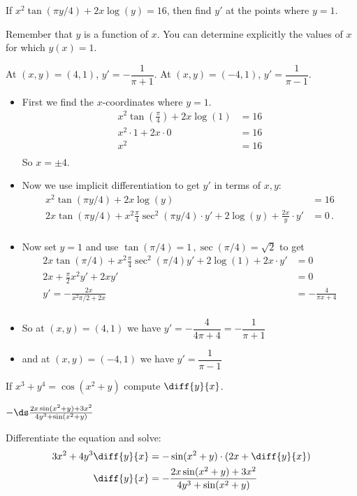\begin{Mquestion}[2015Q]
If $x^2\tan(\pi y/4)+2x\log(y) = 16$, then find $y'$ at the points where $y=1$.
\end{Mquestion}
\begin{hint}
Remember that $y$ is a function of $x$. You can determine
        explicitly the values of $x$ for which $y(x)=1$.
\end{hint}
\begin{answer}
At $(x,y)=(4,1)$, $y' =
-\dfrac{1}{\pi + 1}$.
At $(x,y)=(-4,1)$,  $y' = \dfrac{1}{\pi-1}$.
\end{answer}
\begin{solution}
\begin{itemize}
 \item First we find the $x$-coordinates where $y=1$.
\begin{align*}
  x^2\tan\left(\frac{\pi}{4}\right)+2x\log(1) &= 16 \\
  x^2\cdot 1 +2x\cdot 0 &=16\\
  x^2 &= 16\\
\end{align*}
So $x=\pm 4$.
\item Now we use implicit differentiation to get $y'$ in terms of $x,y$:
\begin{align*}
  x^2\tan(\pi y/4)+2x\log(y) &= 16\\
  2x\tan(\pi y/4) + x^2 \frac{\pi}{4}\sec^2(\pi y/4)\cdot y' + 2\log(y) + \frac{2x}{y} \cdot y' &= 0\,.\\
\end{align*}
\item Now set $y=1$ and use $\tan(\pi/4)=1\,, \sec(\pi/4)=\sqrt{2}$ to get
\begin{align*}
  2x\tan(\pi/4) + x^2 \frac{\pi}{4} \sec^2(\pi/4)y' + 2\log(1) + 2x\cdot y' &= 0\\
  2x + \frac{\pi}{2} x^2 y' +2x y' &= 0 \\
  y' = -\frac{2x}{x^2 \pi/2 + 2x} &= -\frac{4}{\pi x + 4}  \\
\end{align*}
\item So at $(x,y)=(4,1)$ we have $y' = -\dfrac{4}{4\pi+4} =
-\dfrac{1}{\pi + 1}$
\item and at $(x,y)=(-4,1)$ we have $y' = \dfrac{1}{\pi-1}$
\end{itemize}
\end{solution}


\begin{Mquestion}[2015Q]
 If $x^3+y^4 = \cos(x^2+y)$ compute $\diff{y}{x}$.
\end{Mquestion}
\begin{answer}
$ -\ds\frac{2x\sin(x^2+y)+3x^2}{4y^3+\sin(x^2+y)}$
\end{answer}
\begin{solution}
Differentiate the equation and solve:
\begin{align*}
  3x^2 + 4y^3 \diff{y}{x} &= -\sin(x^2+y) \cdot\left(2x + \diff{y}{x}\right) \\
  \diff{y}{x} &= -\frac{2x\sin(x^2+y)+3x^2}{4y^3+\sin(x^2+y)}
\end{align*}
\end{solution}

